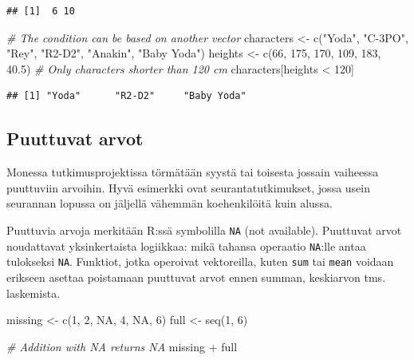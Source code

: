 \documentclass[
]{book}
\newenvironment{Shaded}{\begin{snugshade}}{\end{snugshade}}
\newcommand{\CommentTok}[1]{\textcolor[rgb]{0.56,0.35,0.01}{\textit{#1}}}
\newcommand{\ConstantTok}[1]{\textcolor[rgb]{0.00,0.00,0.00}{#1}}
\newcommand{\DecValTok}[1]{\textcolor[rgb]{0.00,0.00,0.81}{#1}}
\newcommand{\FloatTok}[1]{\textcolor[rgb]{0.00,0.00,0.81}{#1}}
\newcommand{\FunctionTok}[1]{\textcolor[rgb]{0.00,0.00,0.00}{#1}}
\newcommand{\NormalTok}[1]{#1}
\newcommand{\OtherTok}[1]{\textcolor[rgb]{0.56,0.35,0.01}{#1}}
\newcommand{\SpecialCharTok}[1]{\textcolor[rgb]{0.00,0.00,0.00}{#1}}
\newcommand{\StringTok}[1]{\textcolor[rgb]{0.31,0.60,0.02}{#1}}
\begin{document}
\begin{verbatim}
## [1]  6 10
\end{verbatim}

\begin{Shaded}
\begin{Highlighting}[]
\CommentTok{\# The condition can be based on another vector}
\NormalTok{characters }\OtherTok{\textless{}{-}} \FunctionTok{c}\NormalTok{(}\StringTok{"Yoda"}\NormalTok{, }\StringTok{"C{-}3PO"}\NormalTok{, }\StringTok{"Rey"}\NormalTok{, }\StringTok{"R2{-}D2"}\NormalTok{, }\StringTok{"Anakin"}\NormalTok{, }\StringTok{"Baby Yoda"}\NormalTok{)}
\NormalTok{heights }\OtherTok{\textless{}{-}} \FunctionTok{c}\NormalTok{(}\DecValTok{66}\NormalTok{, }\DecValTok{175}\NormalTok{, }\DecValTok{170}\NormalTok{, }\DecValTok{109}\NormalTok{, }\DecValTok{183}\NormalTok{, }\FloatTok{40.5}\NormalTok{)}
\CommentTok{\# Only characters shorter than 120 cm}
\NormalTok{characters[heights }\SpecialCharTok{\textless{}} \DecValTok{120}\NormalTok{]}
\end{Highlighting}
\end{Shaded}

\begin{verbatim}
## [1] "Yoda"      "R2-D2"     "Baby Yoda"
\end{verbatim}

\hypertarget{puuttuvat-arvot}{%
\subsection{Puuttuvat arvot}\label{puuttuvat-arvot}}

Monessa tutkimusprojektissa törmätään syystä tai toisesta jossain vaiheessa puuttuviin arvoihin. Hyvä esimerkki ovat seurantatutkimukset, jossa usein seurannan lopussa on jäljellä vähemmän koehenkilöitä kuin alussa.

Puuttuvia arvoja merkitään R:ssä symbolilla \texttt{NA} (not available). Puuttuvat arvot noudattavat yksinkertaista logiikkaa: mikä tahansa operaatio \texttt{NA}:lle antaa tulokseksi \texttt{NA}. Funktiot, jotka operoivat vektoreilla, kuten \texttt{sum} tai \texttt{mean} voidaan erikseen asettaa poistamaan puuttuvat arvot ennen summan, keskiarvon tms. laskemista.

\begin{Shaded}
\begin{Highlighting}[]
\NormalTok{missing }\OtherTok{\textless{}{-}} \FunctionTok{c}\NormalTok{(}\DecValTok{1}\NormalTok{, }\DecValTok{2}\NormalTok{, }\ConstantTok{NA}\NormalTok{, }\DecValTok{4}\NormalTok{, }\ConstantTok{NA}\NormalTok{, }\DecValTok{6}\NormalTok{)}
\NormalTok{full }\OtherTok{\textless{}{-}} \FunctionTok{seq}\NormalTok{(}\DecValTok{1}\NormalTok{, }\DecValTok{6}\NormalTok{)}

\CommentTok{\# Addition with NA returns NA}
\NormalTok{missing }\SpecialCharTok{+}\NormalTok{ full}
\end{Highlighting}
\end{Shaded}
\end{document}
